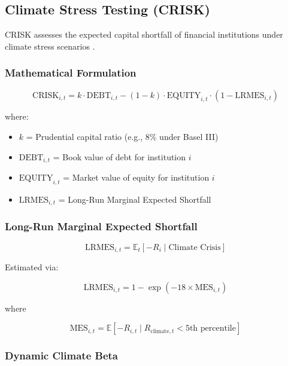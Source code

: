 \documentclass[11pt,a4paper]{article}
\begin{document}
\subsection{Climate Stress Testing (CRISK)}

CRISK assesses the expected capital shortfall of financial institutions under climate stress scenarios \citep{Jung2021, Acharya2023}.

\subsubsection{Mathematical Formulation}

\begin{equation}
\text{CRISK}_{i,t} = k \cdot \text{DEBT}_{i,t} - (1-k) \cdot \text{EQUITY}_{i,t} \cdot (1 - \text{LRMES}_{i,t})
\end{equation}

where:
\begin{itemize}
    \item $k$ = Prudential capital ratio (e.g., 8\% under Basel III)
    \item $\text{DEBT}_{i,t}$ = Book value of debt for institution $i$
    \item $\text{EQUITY}_{i,t}$ = Market value of equity for institution $i$
    \item $\text{LRMES}_{i,t}$ = Long-Run Marginal Expected Shortfall
\end{itemize}

\subsubsection{Long-Run Marginal Expected Shortfall}

\begin{equation}
\text{LRMES}_{i,t} = \mathbb{E}_t[-R_i \mid \text{Climate Crisis}]
\end{equation}

Estimated via:

\begin{equation}
\text{LRMES}_{i,t} = 1 - \exp(-18 \times \text{MES}_{i,t})
\end{equation}

where

\begin{equation}
\text{MES}_{i,t} = \mathbb{E}[-R_{i,t} \mid R_{\text{climate},t} < \text{5th percentile}]
\end{equation}

\subsubsection{Dynamic Climate Beta}
\end{document}
